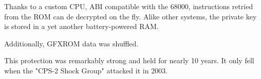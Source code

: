 Thanks to a custom CPU, ABI compatible with the 68000, instructions retried from the ROM can de decrypted on the fly. Alike other systems, the private key is stored in a yet another battery-powered RAM.

Additionally, GFXROM data was shuffled.

\begin{trivia}
This protection was remarkably strong and held for nearly 10 years. It only fell when the "CPS-2 Shock Group" attacked it in 2003\cite{cps2rebirth}.
\end{trivia}



